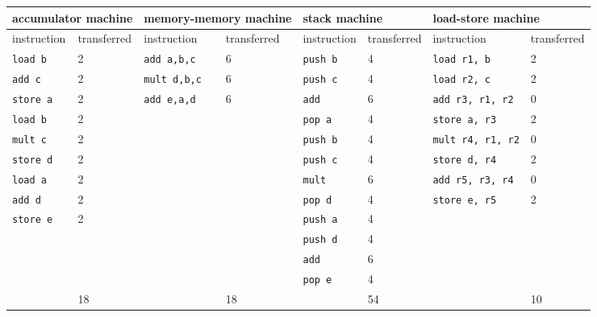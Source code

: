 \documentclass{article}
\begin{document}
\begin{tabular}{l|ll|ll|ll|l|}
\hline
\multicolumn{2}{|l|}{accumulator machine} & \multicolumn{2}{|l|}{memory-memory machine} & \multicolumn{2}{|l|}{stack machine} & \multicolumn{2}{|l|}{load-store machine} \\ \hline
\multicolumn{1}{|l|}{instruction} & transferred & \multicolumn{1}{|l|}{instruction} & transferred & \multicolumn{1}{|l|}{instruction} & transferred & \multicolumn{1}{|l|}{instruction} & transferred \\ \hline
\multicolumn{1}{|l|}{\texttt{load b}} & 2 & \multicolumn{1}{|l|}{\texttt{add a,b,c}} & 6 & \multicolumn{1}{|l|}{\texttt{push b}} & 4 &\multicolumn{1}{|l|}{\texttt{load r1, b}} & 2 \\ 
\multicolumn{1}{|l|}{\texttt{add c}} & 2 &\multicolumn{1}{|l|}{\texttt{mult d,b,c}} & 6 & \multicolumn{1}{|l|}{\texttt{push c}} & 4 & \multicolumn{1}{|l|}{\texttt{load r2, c}} & 2 \\
\multicolumn{1}{|l|}{\texttt{store a}} & 2 & \multicolumn{1}{|l|}{\texttt{add e,a,d}} & 6 & \multicolumn{1}{|l|}{\texttt{add}} & 6 & \multicolumn{1}{|l|}{\texttt{add r3, r1, r2}} & 0\\
\multicolumn{1}{|l|}{\texttt{load b}} & 2 & \multicolumn{1}{|l|}{} & & \multicolumn{1}{|l|}{\texttt{pop a}} & 4 & \multicolumn{1}{|l|}{\texttt{store a, r3}} & 2\\
\multicolumn{1}{|l|}{\texttt{mult c}} & 2 & \multicolumn{1}{|l|}{} & & \multicolumn{1}{|l|}{\texttt{push b}} & 4 & \multicolumn{1}{|l|}{\texttt{mult r4, r1, r2}} & 0 \\
\multicolumn{1}{|l|}{\texttt{store d}} & 2 & \multicolumn{1}{|l|}{} & &\multicolumn{1}{|l|}{\texttt{push c}} & 4 & \multicolumn{1}{|l|}{\texttt{store d, r4}} & 2\\ 
\multicolumn{1}{|l|}{\texttt{load a}} & 2 & \multicolumn{1}{|l|}{} & & \multicolumn{1}{|l|}{\texttt{mult}} & 6 & \multicolumn{1}{|l|}{\texttt{add r5, r3, r4}} & 0 \\
\multicolumn{1}{|l|}{\texttt{add d}} & 2 & \multicolumn{1}{|l|}{} & & \multicolumn{1}{|l|}{\texttt{pop d}} & 4 & \multicolumn{1}{|l|}{\texttt{store e, r5}} & 2\\
\multicolumn{1}{|l|}{\texttt{store e}} & 2 & \multicolumn{1}{|l|}{} & & \multicolumn{1}{|l|}{\texttt{push a}} & 4 & \multicolumn{1}{|l|}{} & \\
\multicolumn{1}{|l|}{} & & \multicolumn{1}{|l|}{} & & \multicolumn{1}{|l|}{\texttt{push d}} & 4 & \multicolumn{1}{|l|}{} & \\ 
\multicolumn{1}{|l|}{} & & \multicolumn{1}{|l|}{} & & \multicolumn{1}{|l|}{\texttt{add}} & 6 & \multicolumn{1}{|l|}{} &\\
\multicolumn{1}{|l|}{} & & \multicolumn{1}{|l|}{} & & \multicolumn{1}{|l|}{\texttt{pop e}} & 4 & \multicolumn{1}{|l|}{} &\\
\hline
 & \multicolumn{1}{|l|}{18} & & \multicolumn{1}{|l|}{18} & & \multicolumn{1}{|l|}{54} & & \multicolumn{1}{|l|}{10} \\
 \cline{2-2}\cline{4-4}\cline{6-6}\cline{8-8}
\end{tabular}
\end{document}
